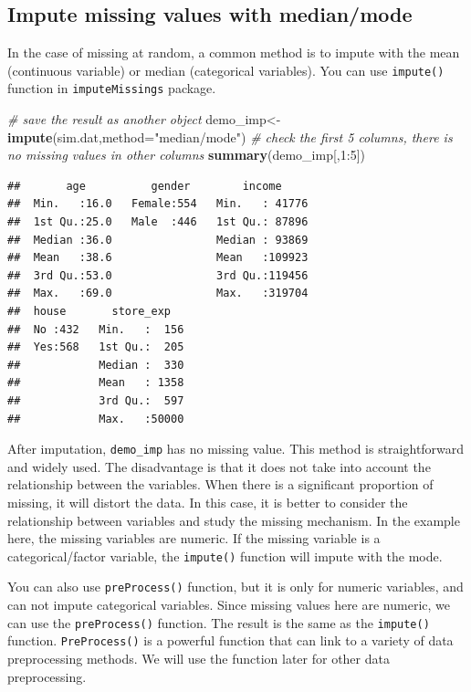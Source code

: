 \documentclass[12pt,]{krantz}
\newenvironment{Shaded}{\begin{snugshade}}{\end{snugshade}}
\newcommand{\KeywordTok}[1]{\textcolor[rgb]{0.13,0.29,0.53}{\textbf{{#1}}}}
\newcommand{\DataTypeTok}[1]{\textcolor[rgb]{0.13,0.29,0.53}{{#1}}}
\newcommand{\DecValTok}[1]{\textcolor[rgb]{0.00,0.00,0.81}{{#1}}}
\newcommand{\StringTok}[1]{\textcolor[rgb]{0.31,0.60,0.02}{{#1}}}
\newcommand{\CommentTok}[1]{\textcolor[rgb]{0.56,0.35,0.01}{\textit{{#1}}}}
\newcommand{\NormalTok}[1]{{#1}}
\theoremstyle{definition}
\theoremstyle{definition}
\theoremstyle{remark}
\begin{document}
\subsection{Impute missing values with
median/mode}\label{impute-missing-values-with-medianmode}

In the case of missing at random, a common method is to impute with the
mean (continuous variable) or median (categorical variables). You can
use \texttt{impute()} function in \texttt{imputeMissings} package.

\begin{Shaded}
\begin{Highlighting}[]
\CommentTok{# save the result as another object}
\NormalTok{demo_imp<-}\KeywordTok{impute}\NormalTok{(sim.dat,}\DataTypeTok{method=}\StringTok{"median/mode"}\NormalTok{)}
\CommentTok{# check the first 5 columns, there is no missing values in other columns}
\KeywordTok{summary}\NormalTok{(demo_imp[,}\DecValTok{1}\NormalTok{:}\DecValTok{5}\NormalTok{])}
\end{Highlighting}
\end{Shaded}

\begin{verbatim}
##       age          gender        income      
##  Min.   :16.0   Female:554   Min.   : 41776  
##  1st Qu.:25.0   Male  :446   1st Qu.: 87896  
##  Median :36.0                Median : 93869  
##  Mean   :38.6                Mean   :109923  
##  3rd Qu.:53.0                3rd Qu.:119456  
##  Max.   :69.0                Max.   :319704  
##  house       store_exp    
##  No :432   Min.   :  156  
##  Yes:568   1st Qu.:  205  
##            Median :  330  
##            Mean   : 1358  
##            3rd Qu.:  597  
##            Max.   :50000
\end{verbatim}

After imputation, \texttt{demo\_imp} has no missing value. This method
is straightforward and widely used. The disadvantage is that it does not
take into account the relationship between the variables. When there is
a significant proportion of missing, it will distort the data. In this
case, it is better to consider the relationship between variables and
study the missing mechanism. In the example here, the missing variables
are numeric. If the missing variable is a categorical/factor variable,
the \texttt{impute()} function will impute with the mode.

You can also use \texttt{preProcess()} function, but it is only for
numeric variables, and can not impute categorical variables. Since
missing values here are numeric, we can use the \texttt{preProcess()}
function. The result is the same as the \texttt{impute()} function.
\texttt{PreProcess()} is a powerful function that can link to a variety
of data preprocessing methods. We will use the function later for other
data preprocessing.
\end{document}
